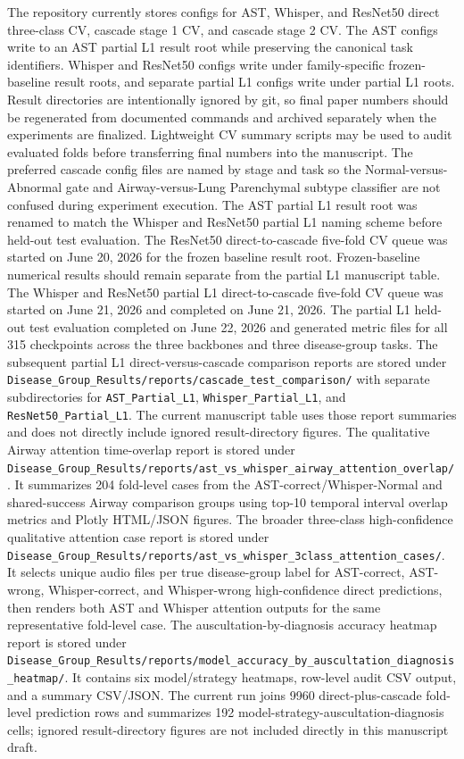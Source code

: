 \documentclass[11pt]{article}
\begin{document}
The repository currently stores configs for AST, Whisper, and ResNet50 direct
three-class CV, cascade stage 1 CV, and cascade stage 2 CV. The AST configs
write to an AST partial L1 result root while preserving the canonical task
identifiers. Whisper and ResNet50 configs write under family-specific
frozen-baseline result roots, and separate partial L1 configs write under
partial L1 roots. Result directories are intentionally ignored by git, so final
paper numbers should be regenerated from documented commands and archived
separately when the experiments are finalized.
Lightweight CV summary scripts may be used to audit evaluated folds before
transferring final numbers into the manuscript. The preferred cascade config
files are named by stage and task so the Normal-versus-Abnormal gate and
Airway-versus-Lung Parenchymal subtype classifier are not confused during
experiment execution.
The AST partial L1 result root was renamed to match the Whisper and ResNet50
partial L1 naming scheme before held-out test evaluation.
The ResNet50 direct-to-cascade five-fold CV queue was started on
June 20, 2026 for the frozen baseline result root. Frozen-baseline numerical
results should remain separate from the partial L1 manuscript table.
The Whisper and ResNet50 partial L1 direct-to-cascade five-fold CV queue was
started on June 21, 2026 and completed on June 21, 2026.
The partial L1 held-out test evaluation completed on June 22, 2026 and
generated metric files for all 315 checkpoints across the three backbones and
three disease-group tasks. The subsequent partial L1 direct-versus-cascade
comparison reports are stored under
\texttt{Disease\_Group\_Results/reports/cascade\_test\_comparison/} with
separate subdirectories for \texttt{AST\_Partial\_L1},
\texttt{Whisper\_Partial\_L1}, and \texttt{ResNet50\_Partial\_L1}. The current
manuscript table uses those report summaries and does not directly include
ignored result-directory figures.
The qualitative Airway attention time-overlap report is stored under
\texttt{Disease\_Group\_Results/reports/ast\_vs\_whisper\_airway\_attention\_overlap/}.
It summarizes 204 fold-level cases from the AST-correct/Whisper-Normal and
shared-success Airway comparison groups using top-10 temporal interval overlap
metrics and Plotly HTML/JSON figures.
The broader three-class high-confidence qualitative attention case report is
stored under
\texttt{Disease\_Group\_Results/reports/ast\_vs\_whisper\_3class\_attention\_cases/}.
It selects unique audio files per true disease-group label for AST-correct,
AST-wrong, Whisper-correct, and Whisper-wrong high-confidence direct
predictions, then renders both AST and Whisper attention outputs for the same
representative fold-level case.
The auscultation-by-diagnosis accuracy heatmap report is stored under
\texttt{Disease\_Group\_Results/reports/model\_accuracy\_by\_auscultation\_diagnosis\_heatmap/}.
It contains six model/strategy heatmaps, row-level audit CSV output, and a
summary CSV/JSON. The current run joins 9960 direct-plus-cascade fold-level
prediction rows and summarizes 192 model-strategy-auscultation-diagnosis
cells; ignored result-directory figures are not included directly in this
manuscript draft.
\end{document}
